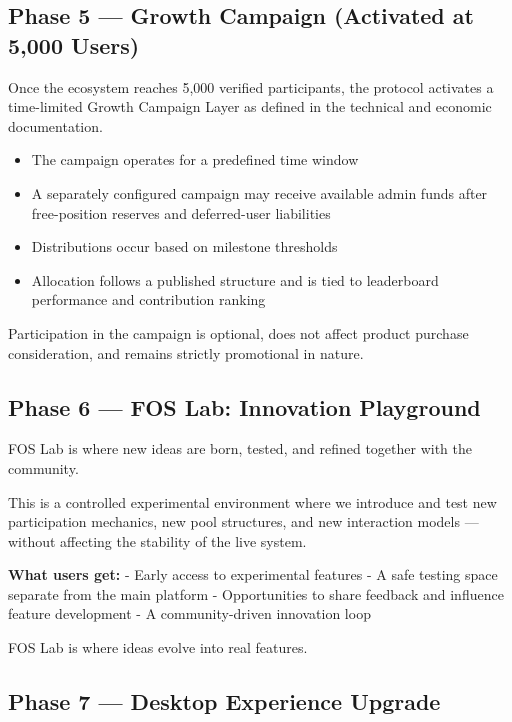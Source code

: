 \documentclass[
  10pt,
  letterpaper,
]{article}
\providecommand{\tightlist}{%
  \setlength{\itemsep}{0pt}\setlength{\parskip}{0pt}}
\begin{document}
\subsection{Phase 5 --- Growth Campaign (Activated at 5,000
Users)}\label{phase-5-growth-campaign-activated-at-5000-users}

Once the ecosystem reaches 5,000 verified participants, the protocol
activates a time-limited Growth Campaign Layer as defined in the
technical and economic documentation.

\begin{itemize}
\tightlist
\item
  The campaign operates for a predefined time window
\item
  A separately configured campaign may receive available admin funds
  after free-position reserves and deferred-user liabilities
\item
  Distributions occur based on milestone thresholds
\item
  Allocation follows a published structure and is tied to leaderboard
  performance and contribution ranking
\end{itemize}

Participation in the campaign is optional, does not affect product
purchase consideration, and remains strictly promotional in nature.

\subsection{Phase 6 --- FOS Lab: Innovation
Playground}\label{phase-6-fos-lab-innovation-playground}

FOS Lab is where new ideas are born, tested, and refined together with
the community.

This is a controlled experimental environment where we introduce and
test new participation mechanics, new pool structures, and new
interaction models --- without affecting the stability of the live
system.

\textbf{What users get:} - Early access to experimental features - A
safe testing space separate from the main platform - Opportunities to
share feedback and influence feature development - A community-driven
innovation loop

FOS Lab is where ideas evolve into real features.

\subsection{Phase 7 --- Desktop Experience
Upgrade}\label{phase-7-desktop-experience-upgrade}
\end{document}
